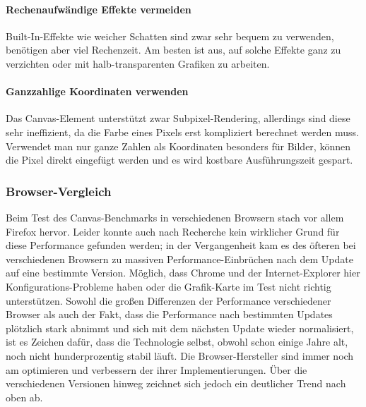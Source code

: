 \documentclass[a4paper, 12pt]{article}
\begin{document}
\paragraph{Rechenaufwändige Effekte vermeiden} Built-In-Effekte wie weicher Schatten sind zwar sehr bequem zu verwenden, benötigen aber viel Rechenzeit. Am besten ist aus, auf solche Effekte ganz zu verzichten oder mit halb-transparenten Grafiken zu arbeiten.
\paragraph{Ganzzahlige Koordinaten verwenden} Das Canvas-Element unterstützt zwar Subpixel-Rendering, allerdings sind diese sehr ineffizient, da die Farbe eines Pixels erst kompliziert berechnet werden muss. Verwendet man nur ganze Zahlen als Koordinaten besonders für Bilder, können die Pixel direkt eingefügt werden und es wird kostbare Ausführungszeit gespart.
\cite{CanvasPerf}
\newpage
\subsubsection{Browser-Vergleich} Beim Test des Canvas-Benchmarks in verschiedenen Browsern stach vor allem Firefox hervor. Leider konnte auch nach Recherche kein wirklicher Grund für diese Performance gefunden werden; in der Vergangenheit kam es des öfteren bei verschiedenen Browsern zu massiven Performance-Einbrüchen nach dem Update auf eine bestimmte Version. Möglich, dass Chrome und der Internet-Explorer hier Konfigurations-Probleme haben oder die Grafik-Karte im Test nicht richtig unterstützen.
Sowohl die großen Differenzen der Performance verschiedener Browser als auch der Fakt, dass die Performance nach bestimmten Updates plötzlich stark abnimmt und sich mit dem nächsten Update wieder normalisiert, ist es Zeichen dafür, dass die Technologie selbst, obwohl schon einige Jahre alt, noch nicht hunderprozentig stabil läuft. Die Browser-Hersteller sind immer noch am optimieren und verbessern der ihrer Implementierungen. Über die verschiedenen Versionen hinweg zeichnet sich jedoch ein deutlicher Trend nach oben ab.
\end{document}
